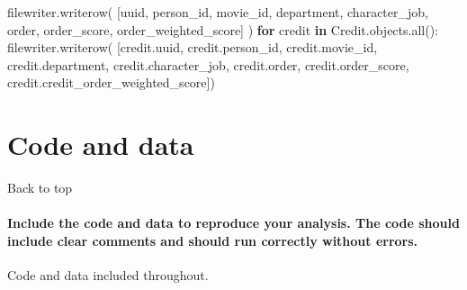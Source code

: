 \documentclass[
]{article}
\newenvironment{Shaded}{\begin{snugshade}}{\end{snugshade}}
\newcommand{\BuiltInTok}[1]{#1}
\newcommand{\ControlFlowTok}[1]{\textcolor[rgb]{0.13,0.29,0.53}{\textbf{#1}}}
\newcommand{\KeywordTok}[1]{\textcolor[rgb]{0.13,0.29,0.53}{\textbf{#1}}}
\newcommand{\NormalTok}[1]{#1}
\newcommand{\StringTok}[1]{\textcolor[rgb]{0.31,0.60,0.02}{#1}}
\begin{document}
\begin{Shaded}
\begin{Highlighting}[]
\NormalTok{                filewriter.writerow(}
\NormalTok{                    [}\StringTok{\textquotesingle{}uuid\textquotesingle{}}\NormalTok{, }\StringTok{\textquotesingle{}person\_id\textquotesingle{}}\NormalTok{, }\StringTok{\textquotesingle{}movie\_id\textquotesingle{}}\NormalTok{, }\StringTok{\textquotesingle{}department\textquotesingle{}}\NormalTok{, }\StringTok{\textquotesingle{}character\_job\textquotesingle{}}\NormalTok{, }\StringTok{\textquotesingle{}order\textquotesingle{}}\NormalTok{, }\StringTok{\textquotesingle{}order\_score\textquotesingle{}}\NormalTok{,}
                     \StringTok{\textquotesingle{}order\_weighted\_score\textquotesingle{}}\NormalTok{]}
\NormalTok{                )}
                \ControlFlowTok{for}\NormalTok{ credit }\KeywordTok{in}\NormalTok{ Credit.objects.}\BuiltInTok{all}\NormalTok{():}
\NormalTok{                    filewriter.writerow(}
\NormalTok{                        [credit.uuid, credit.person\_id, credit.movie\_id, credit.department, credit.character\_job,}
\NormalTok{                         credit.order, credit.order\_score, credit.credit\_order\_weighted\_score])}
\end{Highlighting}
\end{Shaded}

\hypertarget{code-and-data}{%
\section{Code and data}\label{code-and-data}}

Back to top

\hypertarget{include-the-code-and-data-to-reproduce-your-analysis.-the-code-should-include-clear-comments-and-should-run-correctly-without-errors.}{%
\paragraph{Include the code and data to reproduce your analysis. The
code should include clear comments and should run correctly without
errors.}\label{include-the-code-and-data-to-reproduce-your-analysis.-the-code-should-include-clear-comments-and-should-run-correctly-without-errors.}}

Code and data included throughout.
\end{document}
